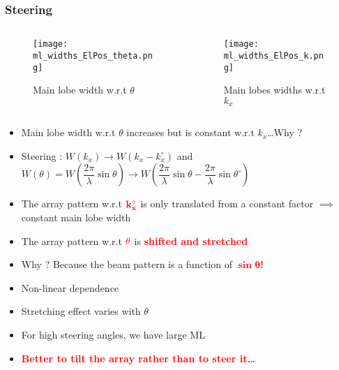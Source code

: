 \documentclass[UKenglish,8pt,aspectratio=1610]{beamer}
\begin{document}
\begin{frame}
	\frametitle{Steering}
		\begin{columns}
		
		\begin{column}{0.5\textwidth}
			\vspace{-15pt}
			\begin{figure}
				\texttt{[image: ml\_widths\_ElPos\_theta.png]}
				\centering
				\caption{Main lobe width w.r.t $\theta$}
			\end{figure}
			
			
		\end{column}
		
		\begin{column}{0.5\textwidth}
			\vspace{-15pt}
			\begin{figure}
				\texttt{[image: ml\_widths\_ElPos\_k.png]}
				\centering
				\caption{Main lobes widths w.r.t $k_x$}
			\end{figure}
		\end{column}
	\end{columns}
\begin{itemize}
	\item Main lobe width w.r.t $\theta$ increases but is constant w.r.t $k_x$\dots Why ?
	\item Steering : $W\left(k_x\right)\rightarrow W\left(k_x-k_x^\circ\right)$ and $W\left(\theta\right)=W\left(\dfrac{2\pi}{\lambda}\sin\theta\right)\rightarrow W\left(\dfrac{2\pi}{\lambda}\sin\theta-\dfrac{2\pi}{\lambda}\sin\theta^\circ\right) $
	\item The array pattern w.r.t $\mathbf{\textcolor{red}{k_x^\circ}}$ is only translated from a constant factor $\implies$ constant main lobe width
		\item The array pattern w.r.t $\textcolor{red}{\mathbf{\theta}}$ is \textbf{\textcolor{red}{shifted and stretched}} 
		\item Why ? Because the beam pattern is a function of \textbf{\textcolor{red}{$\mathbf{\sin\theta}$!}}
		\item Non-linear dependence
		\item Stretching effect varies with $\theta$
		\item For high steering angles, we have large ML
		\item \textcolor{red}{\textbf{Better to tilt the array rather than to steer it\dots}}
\end{itemize}
\end{frame}
\end{document}
